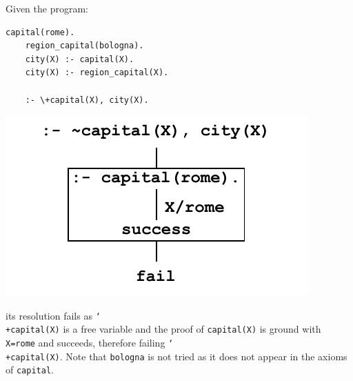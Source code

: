 \begin{description}
\begin{description}
                \begin{example} 
                    Given the program: \\
                    \begin{minipage}{0.45\textwidth}
                        \begin{lstlisting}[language={}, mathescape=true]
    capital(rome).
    region_capital(bologna).
    city(X) :- capital(X).
    city(X) :- region_capital(X).

    :- \+capital(X), city(X).
                        \end{lstlisting}
                    \end{minipage}
                    \begin{minipage}{0.5\textwidth}
                        \includegraphics[width=0.7\linewidth]{img/_sldnf_incorrect_example.pdf}
                    \end{minipage}

                    its resolution fails as \texttt{\char`\\+capital(X)} is a free variable and 
                    the proof of \texttt{capital(X)} is ground with \texttt{X=rome} and succeeds, therefore failing \texttt{\char`\\+capital(X)}.
                    Note that \texttt{bologna} is not tried as it does not appear in the axioms of \texttt{capital}.
                \end{example}
        \end{description}
\end{description}
